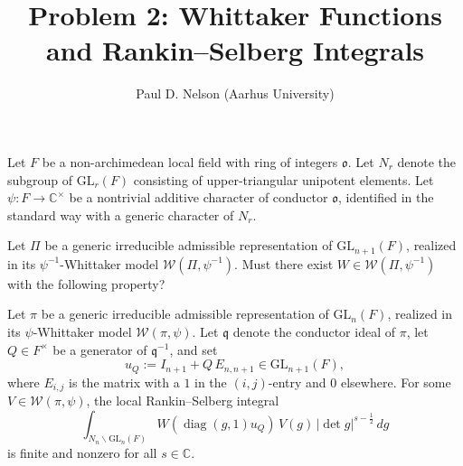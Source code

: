 

\title{Problem 2: Whittaker Functions and Rankin--Selberg Integrals}
\author{Paul D. Nelson (Aarhus University)}
\date{}


\maketitle

Let \(F\) be a non-archimedean local field with ring of integers \(\mathfrak o\).  Let $N_r$ denote the subgroup of $\mathrm{GL}_{r}(F)$ consisting of upper-triangular unipotent elements.  Let \(\psi:F\to \mathbb C^\times\) be a nontrivial additive character of conductor \(\mathfrak o\), identified in the standard way with a generic character of $N_r$.

Let \(\Pi\) be a generic irreducible admissible representation of \(\mathrm{GL}_{n + 1}(F)\), realized in its \(\psi^{-1}\)-Whittaker model \(\mathcal W(\Pi,\psi^{-1})\).  Must there exist \(W\in \mathcal W(\Pi,\psi^{-1})\) with the following property?

Let $\pi$ be a generic irreducible admissible representation of \(\mathrm{GL}_{n}(F)\), realized in its $\psi$-Whittaker model \(\mathcal W(\pi,\psi)\).  Let $\mathfrak{q}$ denote the conductor ideal of $\pi$, let \(Q\in F^\times\) be a generator of \(\mathfrak q^{-1}\), and set
\[
  u_Q := I_{n+1} + Q\,E_{n,n+1} \in \mathrm{GL}_{n + 1}(F),
\]
where \(E_{i, j}\) is the matrix with a \(1\) in the \((i, j)\)-entry and \(0\) elsewhere.  For some \(V\in \mathcal W(\pi,\psi)\), the local Rankin--Selberg integral
\[
  \int_{N_n\backslash \mathrm{GL}_{n}(F)} W(\operatorname{diag}(g,1) u_Q)\,V(g)\,|\det g|^{s-\frac12}\,dg
\]
is finite and nonzero for all \(s\in\mathbb C\).


